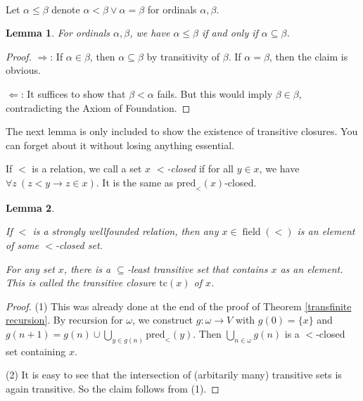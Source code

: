 \documentclass[a4paper, 11pt]{amsart}
\newtheorem{lemma}[lemma]{Lemma}
\theoremstyle{remark}
\newcommand{\pred}{\mathrm{pred}}
\DeclareMathOperator{\field}{field}
\newcommand{\tc}{\mathrm{tc}}
\newenvironment{enumerate-(1)}{\begin{enumerate}[label={\upshape (\arabic*)}, leftmargin=2pc]}{\end{enumerate}}
\begin{document}

\ \\ 
Let $\alpha\leq \beta$ denote $\alpha<\beta \vee \alpha=\beta$ for ordinals $\alpha,\beta$. 

\begin{lemma} 
For ordinals $\alpha,\beta$, we have $\alpha\leq\beta$ if and only if $\alpha\subseteq \beta$. 
\end{lemma} 
\begin{proof} 
$\Rightarrow$: 
If $\alpha\in\beta$, then $\alpha\subseteq\beta$ by transitivity of $\beta$. 
If $\alpha=\beta$, then the claim is obvious. 

$\Leftarrow$: 
It suffices to show that $\beta<\alpha$ fails. 
But this would imply $\beta\in\beta$, contradicting the Axiom of Foundation. 
\end{proof} 

The next lemma is only included to show the existence of transitive closures. 
You can forget about it without losing anything essential. 

If $<$ is a relation, we call a set $x$ \emph{$<$-closed} if for all $y\in x$, we have $\forall z\ (z< y \rightarrow z\in x)$. 
It is the same as $\pred_<(x)$-closed. 


\begin{lemma} \ 
\begin{enumerate-(1)} 
\item 
If $<$ is a strongly wellfounded relation, then any $x\in \field(<) $ is an element of some $<$-closed set. 
\item 
For any set $x$, there is a $\subseteq$-least transitive set that contains $x$ as an element. 
This is called the \emph{transitive closure} $\tc(x)$ of $x$. 
\end{enumerate-(1)} 
\end{lemma} 
\begin{proof} 
(1) 
This was already done at the end of the proof of Theorem \ref{transfinite recursion}. 
By recursion for $\omega$, we construct $g\colon \omega\rightarrow V$ with $g(0)=\{x\}$ and $g(n+1)=g(n)\cup \bigcup_{y\in g(n)}\pred_<(y)$. 
Then $\bigcup_{n\in\omega} g(n)$ is a $<$-closed set containing $x$. 

(2) 
It is easy to see that the intersection of (arbitarily many) transitive sets is again transitive. 
So the claim follows from (1). 
\end{proof} 
\end{document}
